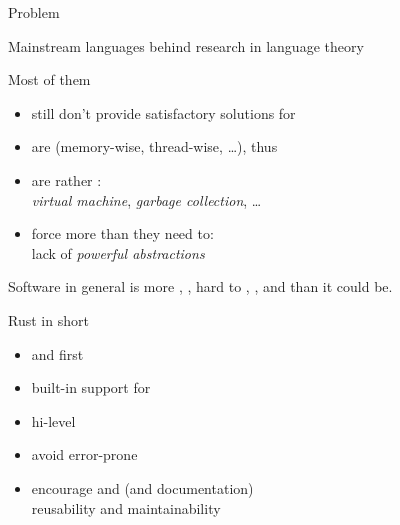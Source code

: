 \documentclass[10pt]{beamer}
\begin{document}
\begin{frame}{Problem}

  Mainstream languages  behind research in language theory
  \bigskip

  Most of them
  \begin{itemize}
    \item still don't provide satisfactory solutions for 
    \item are  (memory-wise, thread-wise, \ldots),
      thus 
    \item are rather :\\
      \emph{virtual machine}, \emph{garbage collection}, \ldots
    \item force more  than they need to:\\
      lack of \emph{powerful abstractions}
  \end{itemize}
  \medskip

  \pause

  Software in general is more , , hard to
  , ,  and  than it
  could be.

\end{frame}




\begin{frame}{Rust in short}

  \begin{itemize}\bigsep
    \item {} and  first
    \item built-in support for 
    \item hi-level 
    \item avoid error-prone 
    \item encourage  and 
      (and documentation)\\
      \daimpl reusability and maintainability
  \end{itemize}

\end{frame}
\end{document}
